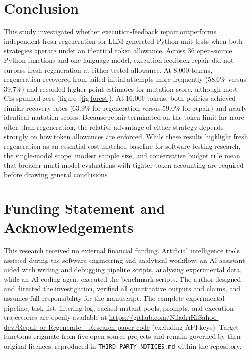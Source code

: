 \documentclass[11pt,a4paper]{article}
\begin{document}
\section{Conclusion}
This study investigated whether execution-feedback repair outperforms independent fresh regeneration for LLM-generated Python unit tests when both strategies operate under an identical token allowance. Across 36 open-source Python functions and one language model, execution-feedback repair did not surpass fresh regeneration at either tested allowance. At 8{,}000 tokens, regeneration recovered from failed initial attempts more frequently (58.6\% versus 39.7\%) and recorded higher point estimates for mutation score, although most CIs spanned zero (figure~\ref{fig:forest}). At 16{,}000 tokens, both policies achieved similar recovery rates (63.9\% for regeneration versus 59.0\% for repair) and nearly identical mutation scores. Because repair terminated on the token limit far more often than regeneration, the relative advantage of either strategy depends strongly on how token allowances are enforced. While these results highlight fresh regeneration as an essential cost-matched baseline for software-testing research, the single-model scope, modest sample size, and conservative budget rule mean that broader multi-model evaluations with tighter token accounting are required before drawing general conclusions.

\section*{Funding Statement and Acknowledgements}
This research received no external financial funding. Artificial intelligence tools assisted during the software-engineering and analytical workflow: an AI assistant aided with writing and debugging pipeline scripts, analysing experimental data, while an AI coding agent executed the benchmark scripts. The author designed and directed the investigation, verified all quantitative outputs and claims, and assumes full responsibility for the manuscript. The complete experimental pipeline, task list, filtering log, cached mutant pools, prompts, and execution trajectories are openly available at \url{https://github.com/NiladriKrSahoo-dev/Repair-or-Regenerate-_Research-paper-code} (excluding API keys). Target functions originate from five open-source projects and remain governed by their original licences, reproduced in \texttt{THIRD\_PARTY\_NOTICES.md} within the repository.
\end{document}
